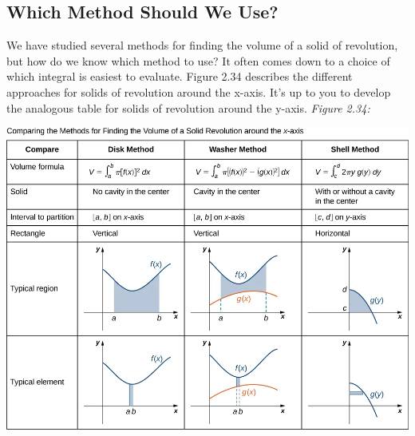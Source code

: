 \documentclass{report}
\begin{document}
    \bigbreak \noindent 
    \subsection*{Which Method Should We Use?}
    \bigbreak \noindent 
    We have studied several methods for finding the volume of a solid of revolution, but how do we know which method to use? It often comes down to a choice of which integral is easiest to evaluate. Figure 2.34 describes the different approaches for solids of revolution around the  x-axis.
      It’s up to you to develop the analogous table for solids of revolution around the  y-axis.
      \bigbreak \noindent 
      \textit{Figure 2.34:}
      \bigbreak \noindent 
      \begin{center}
          \includegraphics[scale=0.5]{./figures/graph31.png}
      \end{center}
    

  

  
  
  
  






    


    
\end{document}
